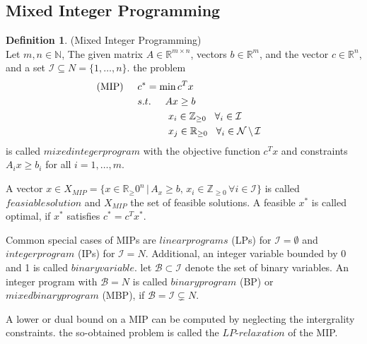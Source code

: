 \documentclass[11pt]{article}
\theoremstyle{definition}
\newtheorem{definition}{Definition}[section] %
\begin{document}
\subsection{Mixed Integer Programming}
\begin{definition}
(Mixed Integer Programming)\\
Let $m,n \in \mathbb{N}$, The given matrix $A\in \mathbb{R}^{m \times n}$, vectors $b\in \mathbb{R}^m$, and the vector $c \in \mathbb{R}^n$, and a set $\mathcal{I} \subseteq N = \{ 1,\dots,n \} $. the problem 
\begin{align*}
\text{(MIP)} \hspace{5mm} &c^* = \text{min}\,c^Tx& \\
&s.t.\hspace{5mm} Ax \geq b  \\
&\hspace{11mm} x_i \in \mathbb{Z}_{\geq0} \hspace{3mm} \forall_i \in \mathcal{I}\\ 
&\hspace{11mm} x_j \in \mathbb{R}_{\geq0} \hspace{3mm} \forall_i \in \mathcal{N}\,\backslash\,  \mathcal{I}
\end{align*}
is called $mixed integer program$ with the objective function $c^Tx$ and constraints $A_ix \geq b_i$ for all $i = 1,\dots ,m$.\par
\label{dif:MIP_def}
\end{definition}
A vector $x\in X_{MIP} = \{x \in \mathbb{R}_\geq0^n\,|\,A_x \geq b, \, x_i \in \mathbb{Z}_{\geq0}\,\forall i \in \mathcal{I}  \}$ is called $feasiable solution$ and $X_{MIP}$ the set of feasible solutions. A feasible $x^*$ is called optimal, if $x^*$ satisfies $c^*=c^Tx^*$. \par
Common special cases of MIPs are $linear programs$ (LPs) for $\mathcal{I} = \emptyset $ and $integer program$ (IPs) for $\mathcal{I} = N$. Additional, an integer variable bounded by 0 and 1 is called $binary variable$. let $\mathcal{B} \subset \mathcal{I}$ denote the set of binary variables. An integer program with $\mathcal{B} = N $ is called $binary program$ (BP) or $mixed binary program$ (MBP), if $\mathcal{B} = \mathcal{I} \subsetneq N$. \par
A lower or dual bound on a MIP can be computed by neglecting the intergrality constraints. the so-obtained problem is called the $LP\text{-}relaxation$ of the MIP. \par
\end{document}

